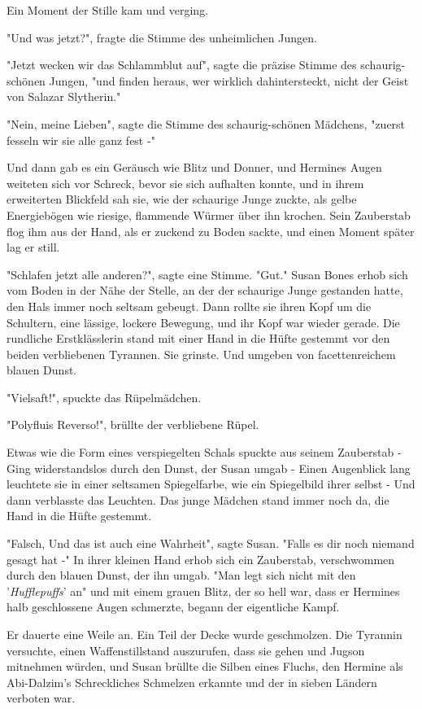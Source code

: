 {Ein Moment der Stille kam und verging.

"Und was jetzt?", fragte die Stimme des unheimlichen Jungen.

"Jetzt wecken wir das Schlammblut auf", sagte die präzise Stimme des schaurig-schönen Jungen, "und finden heraus, wer wirklich dahintersteckt, nicht der Geist von Salazar Slytherin."

"Nein, meine Lieben", sagte die Stimme des schaurig-schönen Mädchens, "zuerst fesseln wir sie alle ganz fest -"

Und dann gab es ein Geräusch wie Blitz und Donner, und Hermines Augen weiteten sich vor Schreck, bevor sie sich aufhalten konnte, und in ihrem erweiterten Blickfeld sah sie, wie der schaurige Junge zuckte, als gelbe Energiebögen wie riesige, flammende Würmer über ihn krochen. Sein Zauberstab flog ihm aus der Hand, als er zuckend zu Boden sackte, und einen Moment später lag er still.

"Schlafen jetzt alle anderen?", sagte eine Stimme. "Gut." Susan Bones erhob sich vom Boden in der Nähe der Stelle, an der der schaurige Junge gestanden hatte, den Hals immer noch seltsam gebeugt. Dann rollte sie ihren Kopf um die Schultern, eine lässige, lockere Bewegung, und ihr Kopf war wieder gerade. Die rundliche Erstklässlerin stand mit einer Hand in die Hüfte gestemmt vor den beiden verbliebenen Tyrannen. Sie grinste. Und umgeben von facettenreichem blauen Dunst.

"Vielsaft!", spuckte das Rüpelmädchen.

"Polyfluis Reverso!", brüllte der verbliebene Rüpel.

Etwas wie die Form eines verspiegelten Schals spuckte aus seinem Zauberstab - Ging widerstandslos durch den Dunst, der Susan umgab - Einen Augenblick lang leuchtete sie in einer seltsamen Spiegelfarbe, wie ein Spiegelbild ihrer selbst - Und dann verblasste das Leuchten. Das junge Mädchen stand immer noch da, die Hand in die Hüfte gestemmt.

"Falsch, Und das ist auch eine Wahrheit", sagte Susan. "Falls es dir noch niemand gesagt hat -" In ihrer kleinen Hand erhob sich ein Zauberstab, verschwommen durch den blauen Dunst, der ihn umgab. "Man legt sich nicht mit den '\emph{Hufflepuffs}' an" und mit einem grauen Blitz, der so hell war, dass er Hermines halb geschlossene Augen schmerzte, begann der eigentliche Kampf.

Er dauerte eine Weile an. Ein Teil der Decke wurde geschmolzen. Die Tyrannin versuchte, einen Waffenstillstand auszurufen, dass sie gehen und Jugson mitnehmen würden, und Susan brüllte die Silben eines Fluchs, den Hermine als Abi-Dalzim's Schreckliches Schmelzen erkannte und der in sieben Ländern verboten war.

}
